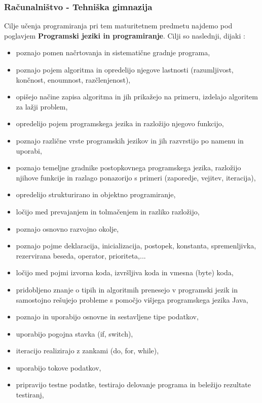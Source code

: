 \subsubsection{Računalništvo - Tehniška gimnazija}

Cilje učenja programiranja pri tem maturitetnem predmetu najdemo pod
poglavjem \textbf{Programski jeziki in programiranje}. Cilji so
naslednji, dijaki \cite{ucni_nacrt-teh-gim}:

\begin{itemize}
\item poznajo pomen načrtovanja in sistematične gradnje programa,
\item poznajo pojem algoritma in opredelijo njegove lastnosti
  (razumljivost, končnost, enoumnost, razčlenjenost),
\item opišejo načine zapisa algoritma in jih prikažejo na primeru,
  izdelajo algoritem za lažji problem,
\item opredelijo pojem programskega jezika in razložijo njegovo
  funkcijo,
\item poznajo različne vrste programskih jezikov in jih
  razvrstijo po namenu in uporabi,
\item poznajo temeljne gradnike postopkovnega programskega jezika, razložijo njihove funkcije in
razlago ponazorijo s primeri (zaporedje, vejitev, iteracija),
\item opredelijo strukturirano in objektno programiranje,
\item ločijo med prevajanjem in tolmačenjem in razliko razložijo,
\item poznajo osnovno razvojno okolje,
\item poznajo pojme deklaracija, inicializacija, postopek, konstanta,
  spremenljivka, rezervirana beseda, operator, prioriteta,...
\item ločijo med pojmi izvorna koda, izvršljiva koda in vmesna (byte)
  koda,
\item pridobljeno znanje o tipih in algoritmih prenesejo v programski
  jezik in samostojno rešujejo probleme s pomočjo višjega programskega
  jezika Java,
\item poznajo in uporabijo osnovne in sestavljene tipe podatkov,
\item uporabijo pogojna stavka (if, switch),
\item iteracijo realizirajo z zankami (do, for, while),
\item uporabijo tokove podatkov,
\item pripravijo testne podatke, testirajo delovanje programa in beležijo rezultate testiranj,

\end{itemize}
